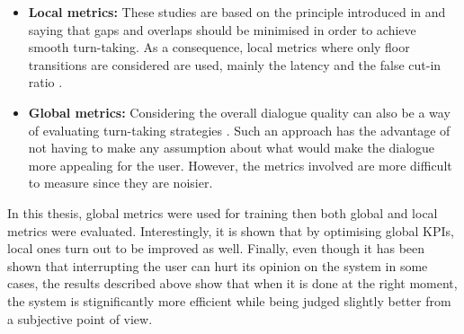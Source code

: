         \begin{itemize}
          \item \textbf{Local metrics:} These studies are based on the principle introduced in \cite{Sacks1974} and saying that gaps and overlaps should be minimised in order to achieve smooth turn-taking. As a consequence, local metrics where only floor transitions are considered are used, mainly the latency and the false cut-in ratio \cite{Jonsdottir2008,Raux2012}.
          \item \textbf{Global metrics:} Considering the overall dialogue quality can also be a way of evaluating turn-taking strategies \cite{Selfridge2010,Ghigi2014}. Such an approach has the advantage of not having to make any assumption about what would make the dialogue more appealing for the user. However, the metrics involved are more difficult to measure since they are noisier.
        \end{itemize}

        In this thesis, global metrics were used for training then both global and local metrics were evaluated. Interestingly, it is shown that by optimising global KPIs, local ones turn out to be improved as well. Finally, even though it has been shown that interrupting the user can hurt its opinion on the system in some cases\cite{Hirasawa1999}, the results described above show that when it is done at the right moment, the system is stignificantly more efficient while being judged slightly better from a subjective point of view.

